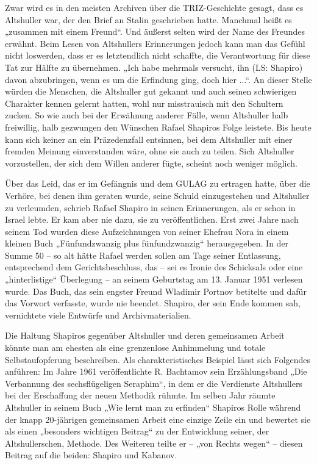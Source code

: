 \documentclass[11pt,a4paper]{article}
\begin{document}
Zwar wird es in den meisten Archiven über die TRIZ-Geschichte gesagt, dass es
Altshuller war, der den Brief an Stalin geschrieben hatte. Manchmal heißt es
„zusammen mit einem Freund“.  Und äußerst selten wird der Name des Freundes
erwähnt. Beim Lesen von Altshullers Erinnerungen jedoch kann man das Gefühl
nicht loswerden, dass er es letztendlich nicht schaffte, die Verantwortung für
diese Tat zur Hälfte zu übernehmen. „Ich habe mehrmals versucht, ihn (LS:
Shapiro) davon abzubringen, wenn es um die Erfindung ging, doch hier ...“. An
dieser Stelle würden die Menschen, die Altshuller gut gekannt und auch seinen
schwierigen Charakter kennen gelernt hatten, wohl nur misstrauisch mit den
Schultern zucken. So wie auch bei der Erwähnung anderer Fälle, wenn Altshuller
halb freiwillig, halb gezwungen den Wünschen Rafael Shapiros Folge leistete.
Bis heute kann sich keiner an ein Präzedenzfall entsinnen, bei dem Altshuller
mit einer fremden Meinung einverstanden wäre, ohne sie auch zu teilen. Sich
Altshuller vorzustellen, der sich dem Willen anderer fügte, scheint noch
weniger möglich.

Über das Leid, das er im Gefängnis und dem GULAG zu ertragen hatte, über die
Verhöre, bei denen ihm geraten wurde, seine Schuld einzugestehen und
Altshuller zu verleumden, schrieb Rafael Shapiro in seinen Erinnerungen, als
er schon in Israel lebte. Er kam aber nie dazu, sie zu veröffentlichen. Erst
zwei Jahre nach seinem Tod wurden diese Aufzeichnungen von seiner Ehefrau Nora
in einem kleinen Buch „Fünfundzwanzig plus fünfundzwanzig“ herausgegeben. In
der Summe 50 – so alt hätte Rafael werden sollen am Tage seiner Entlassung,
entsprechend dem Gerichtsbeschluss, das – sei es Ironie des Schicksals oder
eine „hinterlistige“ Überlegung – an seinem Geburtstag am 13. Januar 1951
verlesen wurde. Das Buch, das sein engster Freund Wladimir Portnov betitelte
und dafür das Vorwort verfasste, wurde nie beendet. Shapiro, der sein Ende
kommen sah, vernichtete viele Entwürfe und Archivmaterialien.

Die Haltung Shapiros gegenüber Altshuller und deren gemeinsamen Arbeit könnte
man am ehesten als eine grenzenlose Anhimmelung und totale Selbstaufopferung
beschreiben. Als charakteristisches Beispiel lässt sich Folgendes anführen: Im
Jahre 1961 veröffentlichte R. Bachtamov sein Erzählungsband „Die Verbannung
des sechsflügeligen Seraphim“, in dem er die Verdienste Altshullers bei der
Erschaffung der neuen Methodik rühmte. Im selben Jahr räumte Altshuller in
seinem Buch „Wie lernt man zu erfinden“ Shapiros Rolle während der knapp
20-jährigen gemeinsamen Arbeit eine einzige Zeile ein und bewertet sie als
einen „besonders wichtigen Beitrag“ zu der Entwicklung seiner, der
Altshullerschen, Methode. Des Weiteren teilte er -- „von Rechts wegen“ --
diesen Beitrag auf die beiden: Shapiro und Kabanov.
\end{document}
